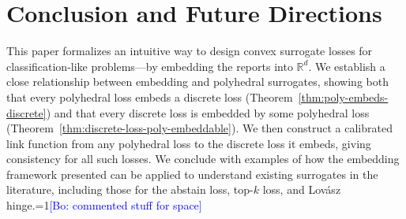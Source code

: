 \documentclass[12pt]{article}
\newcommand{\Comments}{1}
\newcommand{\mynote}[2]{\ifnum\Comments=1\textcolor{#1}{#2}\fi}
\newcommand{\raf}[1]{\mynote{green}{[RF: #1]}}
\newcommand{\bo}[1]{\mynote{blue}{[Bo: #1]}}
\newcommand{\reals}{\mathbb{R}}
\newcommand{\E}{\mathbb{E}}
\newcommand{\risk}[1]{\underline{#1}}
\newcommand{\inprod}[2]{\langle #1, #2 \rangle}%
\begin{document}

\section{Conclusion and Future Directions} \label{sec:conclusion}
This paper formalizes an intuitive way to design convex surrogate losses for classification-like problems---by embedding the reports into $\reals^d$.
We establish a close relationship between embedding and polyhedral surrogates, showing both that every polyhedral loss embeds a discrete loss (Theorem~\ref{thm:poly-embeds-discrete}) and that every discrete loss is embedded by some polyhedral loss (Theorem~\ref{thm:discrete-loss-poly-embeddable}).
We then construct a calibrated link function from any polyhedral loss to the discrete loss it embeds, giving consistency for all such losses.
We conclude with examples of how the embedding framework presented can be applied to understand existing surrogates in the literature, including those for the abstain loss, top-$k$ loss, and Lov\'asz hinge.\bo{commented stuff for space}
\end{document}
